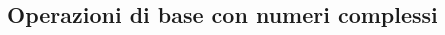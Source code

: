 \begin{questions}
\begin{qblock}
\begin{multicols}{2}
		\end{multicols}
	\end{qblock}


\end{questions}

\subsection{Operazioni di base con numeri complessi}

